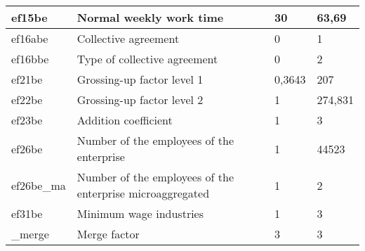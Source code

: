 \begin{table}[H]
\begin{tabular}{|l|l|l|l|}
ef15be     & Normal weekly work time                                & 30     & 63,69   \\ \hline
ef16abe    & Collective agreement                                   & 0      & 1       \\ \hline
ef16bbe    & Type of collective agreement                           & 0      & 2       \\ \hline
ef21be     & Grossing-up factor level 1                             & 0,3643 & 207     \\ \hline
ef22be     & Grossing-up factor level 2                             & 1      & 274,831 \\ \hline
ef23be     & Addition coefficient                                   & 1      & 3       \\ \hline
ef26be     & Number of the employees of the enterprise                            & 1      & 44523   \\ \hline
ef26be\_ma & Number of the employees of the enterprise microaggregated           & 1      & 2       \\ \hline
ef31be     & Minimum wage industries                                & 1      & 3       \\ \hline
\_merge    & Merge factor                                           & 3      & 3       \\ \hline
\end{tabular}
\end{table}